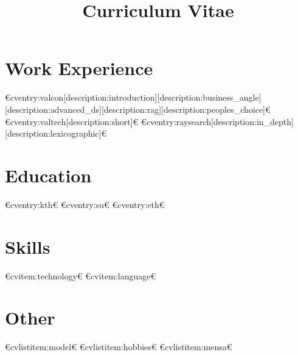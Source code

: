 
\title{Curriculum Vitae}



\newcommand{\role}{Generative AI engineer}
\newcommand{\company}{Novo Nordisk Foundation}



  \makecvtitle

  \section{Work Experience}
  €cventry:valcon[description:introduction][description:business_angle][description:advanced_ds][description:rag][description:peoples_choice]€
  €cventry:valtech[description:short]€
  €cventry:raysearch[description:in_depth][description:lexicographic]€

  \section{Education}
  €cventry:kth€
  €cventry:su€
  €cventry:eth€

  \section{Skills}
  €cvitem:technology€
  €cvitem:language€

  \section{Other}
  €cvlistitem:model€
  €cvlistitem:hobbies€
  €cvlistitem:mensa€
